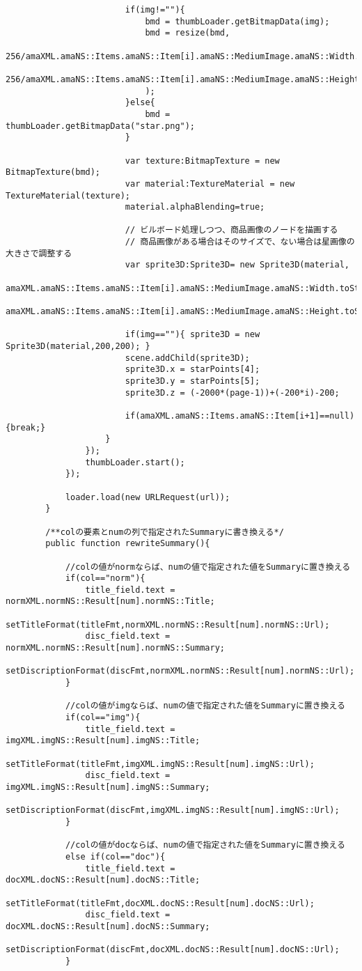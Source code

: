 {\begin{verbatim}
						if(img!=""){
							bmd = thumbLoader.getBitmapData(img);
							bmd = resize(bmd,
							256/amaXML.amaNS::Items.amaNS::Item[i].amaNS::MediumImage.amaNS::Width.toString(),
							256/amaXML.amaNS::Items.amaNS::Item[i].amaNS::MediumImage.amaNS::Height.toString()
							);
						}else{
							bmd = thumbLoader.getBitmapData("star.png");
						}
						
						var texture:BitmapTexture = new BitmapTexture(bmd);
						var material:TextureMaterial = new TextureMaterial(texture);
						material.alphaBlending=true;
						
						// ビルボード処理しつつ、商品画像のノードを描画する
						// 商品画像がある場合はそのサイズで、ない場合は星画像の大きさで調整する
						var sprite3D:Sprite3D= new Sprite3D(material,
						amaXML.amaNS::Items.amaNS::Item[i].amaNS::MediumImage.amaNS::Width.toString(),
						amaXML.amaNS::Items.amaNS::Item[i].amaNS::MediumImage.amaNS::Height.toString());
						
						if(img==""){ sprite3D = new Sprite3D(material,200,200); }
						scene.addChild(sprite3D);
						sprite3D.x = starPoints[4];
						sprite3D.y = starPoints[5];
						sprite3D.z = (-2000*(page-1))+(-200*i)-200;
						
						if(amaXML.amaNS::Items.amaNS::Item[i+1]==null){break;}
					}
				});
				thumbLoader.start();
			});
			
			loader.load(new URLRequest(url));
		}
		
		/**colの要素とnumの列で指定されたSummaryに書き換える*/
		public function rewriteSummary(){
			
			//colの値がnormならば、numの値で指定された値をSummaryに置き換える
			if(col=="norm"){
				title_field.text = normXML.normNS::Result[num].normNS::Title;
				setTitleFormat(titleFmt,normXML.normNS::Result[num].normNS::Url);
				disc_field.text = normXML.normNS::Result[num].normNS::Summary;
				setDiscriptionFormat(discFmt,normXML.normNS::Result[num].normNS::Url);
			}
			
			//colの値がimgならば、numの値で指定された値をSummaryに置き換える
			if(col=="img"){
				title_field.text = imgXML.imgNS::Result[num].imgNS::Title;
				setTitleFormat(titleFmt,imgXML.imgNS::Result[num].imgNS::Url);
				disc_field.text = imgXML.imgNS::Result[num].imgNS::Summary;
				setDiscriptionFormat(discFmt,imgXML.imgNS::Result[num].imgNS::Url);
			}
			
			//colの値がdocならば、numの値で指定された値をSummaryに置き換える
			else if(col=="doc"){
				title_field.text = docXML.docNS::Result[num].docNS::Title;
				setTitleFormat(titleFmt,docXML.docNS::Result[num].docNS::Url);
				disc_field.text = docXML.docNS::Result[num].docNS::Summary;
				setDiscriptionFormat(discFmt,docXML.docNS::Result[num].docNS::Url);
			}
			

\end{verbatim}}
